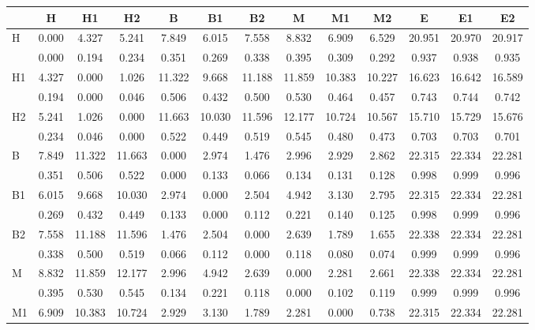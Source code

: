 \begin{table*}[h!]
\begin{center}
\begin{tabular}{| l | c | c | c | c | c | c | c | c | c | c | c | c |}\hline
 & H & H1 & H2 & B & B1 & B2 & M & M1 & M2 & E & E1 & E2 \\\hline
H & 0.000  & 4.327  & 5.241  & 7.849  & 6.015  & 7.558  & 8.832  & 6.909  & 6.529  & 20.951  & 20.970  & 20.917 \\\hline
 & 0.000  & 0.194  & 0.234  & 0.351  & 0.269  & 0.338  & 0.395  & 0.309  & 0.292  & 0.937  & 0.938  & 0.935 \\\hline
H1 & 4.327  & 0.000  & 1.026  & 11.322  & 9.668  & 11.188  & 11.859  & 10.383  & 10.227  & 16.623  & 16.642  & 16.589 \\\hline
 & 0.194  & 0.000  & 0.046  & 0.506  & 0.432  & 0.500  & 0.530  & 0.464  & 0.457  & 0.743  & 0.744  & 0.742 \\\hline
H2 & 5.241  & 1.026  & 0.000  & 11.663  & 10.030  & 11.596  & 12.177  & 10.724  & 10.567  & 15.710  & 15.729  & 15.676 \\\hline
 & 0.234  & 0.046  & 0.000  & 0.522  & 0.449  & 0.519  & 0.545  & 0.480  & 0.473  & 0.703  & 0.703  & 0.701 \\\hline
B & 7.849  & 11.322  & 11.663  & 0.000  & 2.974  & 1.476  & 2.996  & 2.929  & 2.862  & 22.315  & 22.334  & 22.281 \\\hline
 & 0.351  & 0.506  & 0.522  & 0.000  & 0.133  & 0.066  & 0.134  & 0.131  & 0.128  & 0.998  & 0.999  & 0.996 \\\hline
B1 & 6.015  & 9.668  & 10.030  & 2.974  & 0.000  & 2.504  & 4.942  & 3.130  & 2.795  & 22.315  & 22.334  & 22.281 \\\hline
 & 0.269  & 0.432  & 0.449  & 0.133  & 0.000  & 0.112  & 0.221  & 0.140  & 0.125  & 0.998  & 0.999  & 0.996 \\\hline
B2 & 7.558  & 11.188  & 11.596  & 1.476  & 2.504  & 0.000  & 2.639  & 1.789  & 1.655  & 22.338  & 22.334  & 22.281 \\\hline
 & 0.338  & 0.500  & 0.519  & 0.066  & 0.112  & 0.000  & 0.118  & 0.080  & 0.074  & 0.999  & 0.999  & 0.996 \\\hline
M & 8.832  & 11.859  & 12.177  & 2.996  & 4.942  & 2.639  & 0.000  & 2.281  & 2.661  & 22.338  & 22.334  & 22.281 \\\hline
 & 0.395  & 0.530  & 0.545  & 0.134  & 0.221  & 0.118  & 0.000  & 0.102  & 0.119  & 0.999  & 0.999  & 0.996 \\\hline
M1 & 6.909  & 10.383  & 10.724  & 2.929  & 3.130  & 1.789  & 2.281  & 0.000  & 0.738  & 22.315  & 22.334  & 22.281 \\\hline

\end{tabular}
\end{center}
\end{table*}
